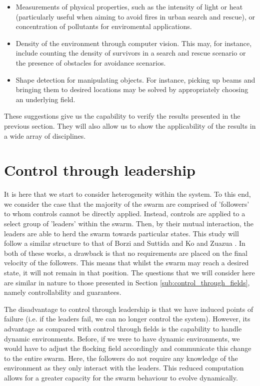 \documentclass[../sample.tex]{subfiles}
\begin{document}
	\begin{itemize}
		\item Measurements of physical properties, such as the intensity of light or heat 
		(particularly useful when aiming to avoid fires in urban search and rescue), or
		concentration of pollutants for enviromental applications.
		\item Density of the environment through computer vision. This may, for instance, include
		counting the density of survivors in a search and rescue scenario or the presence of
		obstacles for avoidance scenarios.
		\item Shape detection for manipulating objects. For instance, picking up beams and bringing
		them to desired locations may be solved by appropriately choosing an underlying field.
	\end{itemize}

	These suggestions give us the capability to verify the results presented in the previous
	section. They will also allow us to show the applicability of the results in a wide array of
	disciplines.

	\section{Control through leadership} %
	\label{sec:control_through_leadership}
	
	It is here that we start to consider heterogeneity within the system. To this end, we consider
	the case that the majority of the swarm are comprised of 'followers' to whom controls cannot be
	directly applied. Instead, controls are applied to a select group of 'leaders' within the swarm.
	Then, by their mutual interaction, the leaders are able to herd the swarm towards particular
	states. This study will follow a similar structure to that of Borzi and Suttida 
	\cite{Borzi2015} and Ko and Zuazua \cite{Ko2019}. In both of these works, a
	drawback is that no requirements are placed on the final velocity of the followers. This
	means that whilst the swarm may reach a desired state, it will not remain in that
	position. The questions that we will consider here are similar in nature to those presented in
	Section \ref{sub:control_through_fields}, namely controllability and guarantees.

	The disadvantage to control through leadership is that we have induced points of failure (i.e.
	if the leaders fail, we can no longer control the system). However, its advantage as compared
	with control through fields is the capability to handle dynamic environments. Before, if we were
	to have dynamic environments, we would have to adjust the flocking field accordingly and
	communicate this change to the entire swarm. Here, the followers do not require any knowledge of
	the environment as they only interact with the leaders. This reduced computation allows for a
	greater capacity for the swarm behaviour to evolve dynamically.
\end{document}
